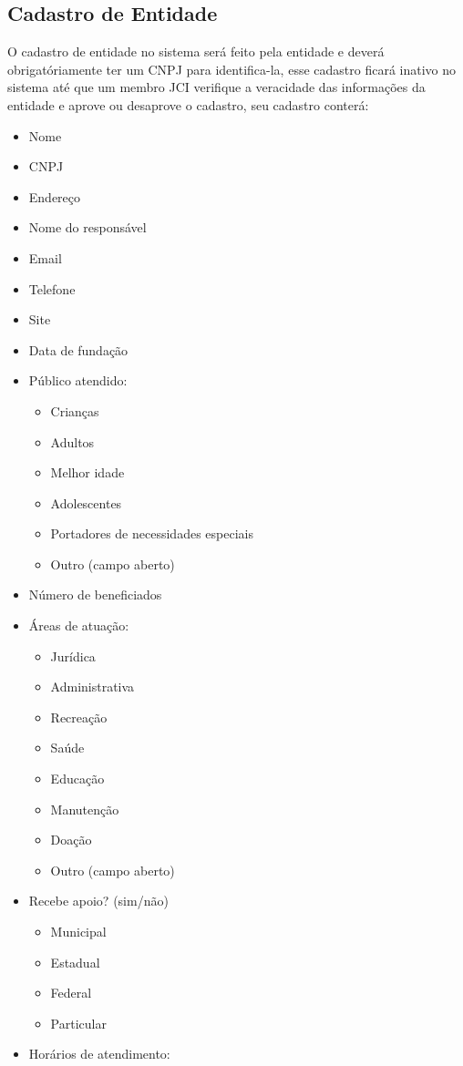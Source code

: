     \subsection{Cadastro de Entidade}
    O cadastro de entidade no sistema será feito pela entidade e deverá obrigatóriamente ter um CNPJ para identifica-la, esse cadastro ficará inativo no sistema até 
    que um membro JCI verifique a veracidade das informações da entidade e aprove ou desaprove o cadastro, seu cadastro conterá:
    \begin{itemize}
        \item Nome
        \item CNPJ
        \item Endereço
        \item Nome do responsável
        \item Email
        \item Telefone
        \item Site
        \item Data de fundação
        \item Público atendido:
          \begin{itemize}
          \item Crianças
          \item Adultos
          \item Melhor idade
          \item Adolescentes
          \item Portadores de necessidades especiais
          \item Outro (campo aberto)
          \end{itemize}
        \item Número de beneficiados
        \item Áreas de atuação: 
          \begin{itemize}
            \item Jurídica
            \item Administrativa
            \item Recreação
            \item Saúde
            \item Educação
            \item Manutenção
            \item Doação
            \item Outro (campo aberto)
          \end{itemize}
        \item Recebe apoio? (sim/não)
          \begin{itemize}
            \item Municipal
            \item Estadual
            \item Federal
            \item Particular
          \end{itemize}
        \item Horários de atendimento:
      \end{itemize}

